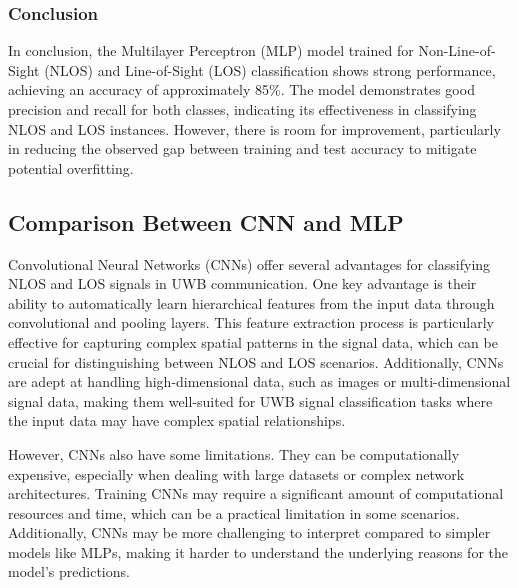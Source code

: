 \subsubsection{Conclusion}

In conclusion, the Multilayer Perceptron (MLP) model trained for Non-Line-of-Sight (NLOS) and Line-of-Sight (LOS) classification shows strong performance, achieving an accuracy of approximately 85\%. The model demonstrates good precision and recall for both classes, indicating its effectiveness in classifying NLOS and LOS instances. However, there is room for improvement, particularly in reducing the observed gap between training and test accuracy to mitigate potential overfitting.

\subsection{Comparison Between CNN and MLP}\label{cnn_vs_mlp}


Convolutional Neural Networks (CNNs) offer several advantages for classifying NLOS and LOS signals in UWB communication. One key advantage is their ability to automatically learn hierarchical features from the input data through convolutional and pooling layers. This feature extraction process is particularly effective for capturing complex spatial patterns in the signal data, which can be crucial for distinguishing between NLOS and LOS scenarios. Additionally, CNNs are adept at handling high-dimensional data, such as images or multi-dimensional signal data, making them well-suited for UWB signal classification tasks where the input data may have complex spatial relationships.

However, CNNs also have some limitations. They can be computationally expensive, especially when dealing with large datasets or complex network architectures. Training CNNs may require a significant amount of computational resources and time, which can be a practical limitation in some scenarios. Additionally, CNNs may be more challenging to interpret compared to simpler models like MLPs, making it harder to understand the underlying reasons for the model's predictions.

